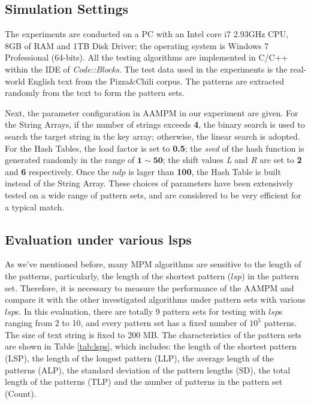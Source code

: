 \documentclass{article}
\begin{document}
\subsection{Simulation Settings}

The experiments are conducted on a PC with an Intel core i7 2.93GHz
CPU, 8GB of RAM and 1TB Disk Driver; the operating system is Windows 7
Professional (64-bits). All the testing algorithms are implemented in
C/C++ within the IDE of \emph{Code::Blocks}. The test data used in the
experiments is the real-world English text from the Pizza\;\&\;Chili
corpus. The patterns are extracted randomly from the text to form the
pattern sets.

Next, the parameter configuration in \textsf{AAMPM} in our experiment
are given. For the String Arrays, if the number of strings exceeds
\textbf{4}, the binary search is used to search the target string in
the key array; otherwise, the linear search is adopted. For the Hash
Tables, the load factor is set to \textbf{0.5}; the \emph{seed} of the
hash function is generated randomly in the range of
$\mathbf{1} \sim \mathbf{50}$; the shift values \emph{L} and \emph{R}
are set to \textbf{2} and \textbf{6} respectively. Once the $ndp$ is
lager than \textbf{100}, the Hash Table is built instead of the String
Array. These choices of parameters have been extensively tested on a
wide range of pattern sets, and are considered to be very efficient
for a typical match.




\subsection{Evaluation under various lsps}

As we've mentioned before, many MPM algorithms are sensitive to the
length of the patterns, particularly, the length of the shortest
pattern ($lsp$) in the pattern set. Therefore, it is necessary to
measure the performance of the \textsf{AAMPM} and compare it with the
other investigated algorithms under pattern sets with various
$lsp$s. In this evaluation, there are totally 9 pattern sets for
testing with $lsp$s ranging from 2 to 10, and every pattern set has a
fixed number of $10^5$ patterns. The size of text string is fixed to
200 MB. The characteristics of the pattern sets are shown in Table
\ref{tab:lsps}, which includes: the length of the shortest pattern
(LSP), the length of the longest pattern (LLP), the average length of
the patterns (ALP), the standard deviation of the pattern lengths
(SD), the total length of the patterns (TLP) and the number of
patterns in the pattern set (Count).
\end{document}
